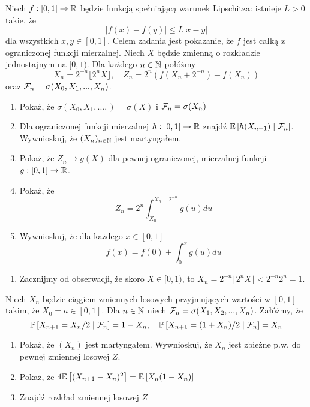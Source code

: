 \begin{problem}
  Niech $f:[0,1]\to\operatorname{\mathbb{R}}$ będzie funkcją spełniającą warunek Lipschitza: istnieje $L>0$ takie, że
  $$|f(x)-f(y)|\leq L|x-y|$$
  dla wszystkich $x,y\in[0,1]$. Celem zadania jest pokazanie, że $f$ jest całką z ograniczonej funkcji mierzalnej. Niech $X$ będzie zmienną o rozkładzie jednostajnym na $[0,1)$. Dla każdego $n\in\operatorname{\mathbb{N}}$ połóżmy
  $$X_n=2^{-n}\lfloor 2^nX\rfloor,\quad Z_n=2^n(f(X_n+2^{-n}) - f(X_n))$$
  oraz $\mathcal{F}_n=\sigma(X_0,X_1,...,X_n)$.
  \begin{enumerate}[label=(\alph*)]
    \item Pokaż, że $\sigma(X_0,X_1,...,)=\sigma(X)$ i $\mathcal{F}_n=\sigma(X_n)$
    \item Dla ograniczonej funkcji mierzalnej $h:[0,1]\to\operatorname{\mathbb{R}}$ znajdź $\expected{h(X_{n+1})}{\set{F}_n}$. Wywnioskuj, że $(X_n)_{n\in\operatorname{\mathbb{N}}}$ jest martyngałem.
    \item Pokaż, że $Z_n\to g(X)$ dla pewnej ograniczonej, mierzalnej funkcji $g:[0,1]\to\operatorname{\mathbb{R}}$.
    \item Pokaż, że
      $$Z_n=2^n\int_{X_n}^{X_n+2^{-n}}g(u)du$$
    \item Wywnioskuj, że dla każdego $x\in[0,1]$ 
      $$f(x)=f(0)+\int_0^x g(u)du$$
  \end{enumerate}
\end{problem}

\begin{solution}
  \begin{enumerate}[label=(\alph*)]
    \item Zacznijmy od obserwacji, że skoro $X\in[0,1)$, to $X_n=2^{-n}\lfloor 2^n X\rfloor <2^{-n}2^n=1$.
  \end{enumerate}
\end{solution}

\begin{problem}
  Niech $X_n$ będzie ciągiem zmiennych losowych przyjmujących wartości w $[0,1]$ takim, że $X_0=a\in[0,1]$. Dla $n\in\operatorname{\mathbb{N}}$ niech $\mathcal{F}_n=\sigma(X_1,X_2,...,X_n)$. Załóżmy, że
  $$\prob{X_{n+1}=X_n/2}{\set{F}_n}=1-X_n,\quad \prob{X_{n+1}=(1+X_n)/2}{\set{F}_n}=X_n$$
  \begin{enumerate}[label=(\alph*)]
    \item Pokaż, że $(X_n)$ jest martyngałem. Wywnioskuj, że $X_n$ jest zbieżne p.w. do pewnej zmiennej losowej $Z$.
    \item Pokaż, że $4\expected{(X_{n+1}-X_n)^2}=\expected{X_n(1-X_n)}$
    \item Znajdź rozkład zmiennej losowej $Z$
  \end{enumerate}
\end{problem}

\begin{solution}
\end{solution}

